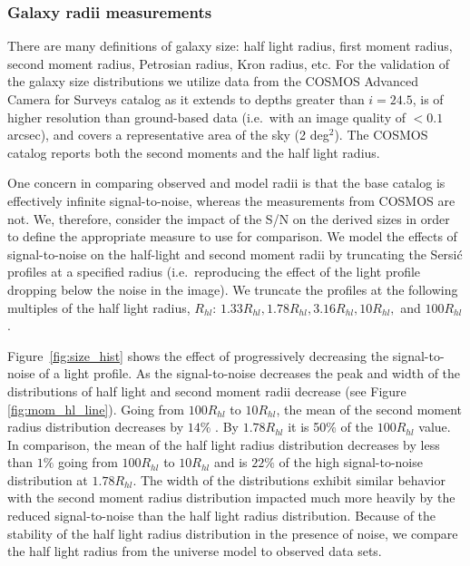 \documentclass[11pt]{article}
\begin{document}
\subsubsection{Galaxy radii measurements}
There are many definitions of galaxy size: half light radius, first
moment radius, second moment radius, Petrosian radius, Kron radius,
etc.  For the validation of the galaxy size distributions we utilize
data from the COSMOS Advanced Camera for Surveys catalog
\citep{cosmos} as it extends to depths greater than $i=24.5$, is of
higher resolution than ground-based data (i.e.\ with an image quality
of $<0.1$ arcsec), and covers a representative area of the sky (2
deg$^2$). The COSMOS catalog reports both the second moments and the
half light radius.

One concern in comparing observed and model radii is that the base
catalog is effectively infinite signal-to-noise, whereas the
measurements from COSMOS are not.  We, therefore, consider the impact
of the S/N on the derived sizes in order to define the appropriate
measure to use for comparison. We model the effects of signal-to-noise
on the half-light and second moment radii by truncating the Sersi{\'c}
profiles at a specified radius (i.e.\ reproducing the effect of the
light profile dropping below the noise in the image).  We truncate the
profiles at the following multiples of the half light radius,
$R_{hl}$: $1.33R_{hl}, 1.78R_{hl}, 3.16R_{hl}, 10R_{hl},
$ and $100R_{hl}$.

Figure~\ref{fig:size_hist} shows the effect of progressively
decreasing the signal-to-noise of a light profile.  As the
signal-to-noise decreases the peak and width of the distributions of
half light and second moment radii decrease (see Figure
\ref{fig:mom_hl_line}).  Going from $100R_{hl}$ to $10R_{hl}$, the
mean of the second moment radius distribution decreases by $14\%$ . By
$1.78R_{hl}$ it is 50\% of the $100R_{hl}$ value.  In comparison, the
mean of the half light radius distribution decreases by less than
$1\%$ going from $100R_{hl}$ to $10R_{hl}$ and is $22\%$ of the high
signal-to-noise distribution at $1.78R_{hl}$.  The width of the distributions exhibit
similar behavior with the second moment radius distribution impacted
much more heavily by the reduced signal-to-noise than the half light
radius distribution.  Because of the stability of the half light
radius distribution in the presence of noise, we compare the half
light radius from the universe model to observed data sets.
\end{document}
